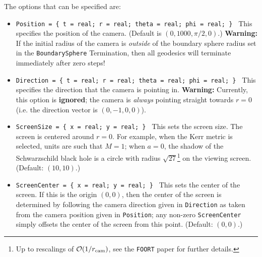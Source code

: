 \documentclass[11pt,a4paper]{article}
\newcommand{\code}[1]{{\tt #1}}
\begin{document}
The options that can be specified are:
\begin{itemize}
 \item \code{Position = \{ t = real; r = real; theta = real; phi = real; \} }\newline
 This specifies the position of the camera. (Default is $(0,1000,\pi/2,0)$.)
 \newline \textbf{Warning:} If the initial radius of the camera is \emph{outside} of the boundary sphere radius set in the \code{BoundarySphere} Termination, then all geodesics will terminate immediately after zero steps!
 \item \code{Direction = \{ t = real; r = real; theta = real; phi = real; \} }\newline
 This specifies the direction that the camera is pointing in.
 \newline \textbf{Warning:} Currently, this option is \textbf{ignored}; the camera is \emph{always} pointing straight towards $r=0$ (i.e. the direction vector is $(0,-1,0,0)$).
 \item \code{ScreenSize = \{ x = real; y = real; \} }\newline
 This sets the screen size. The screen is centered around $r=0$. For example, when the Kerr metric is selected, units are such that $M=1$; when $a=0$, the shadow of the Schwarzschild black hole is a circle with radius $\sqrt{27}$\footnote{Up to rescalings of $\mathcal{O}(1/r_{\rm cam})$, see the \code{FOORT} paper for further details.} on the viewing screen. (Default: $(10,10)$.)
 \item \code{ScreenCenter = \{ x = real; y = real; \} }\newline
 This sets the center of the screen. If this is the origin $(0, 0)$, then the center of the screen is determined by following the camera direction given in \code{Direction} as taken from the camera position given in \code{Position}; any non-zero \code{ScreenCenter} simply offsets the center of the screen from this point. (Default: $(0,0)$.)
\end{itemize}
\end{document}
